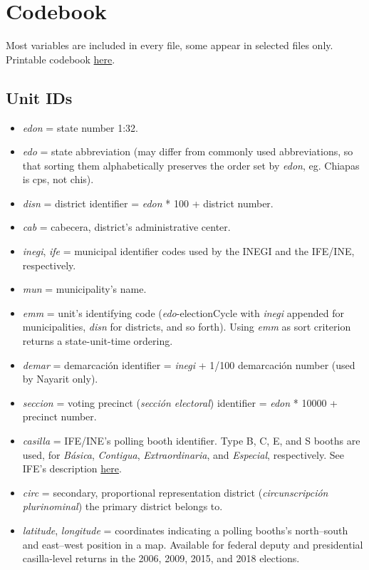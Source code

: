 \documentclass[11pt]{article}
\begin{document}
\section{Codebook}
\label{sec:orgffd06a6}
Most variables are included in every file, some appear in selected files only. Printable codebook \href{./codebook-flier.pdf}{here}. 
\subsection{Unit IDs}
\label{sec:org0b1b818}
\begin{itemize}
\item \emph{edon} = state number 1:32.
\item \emph{edo} = state abbreviation (may differ from commonly used abbreviations, so that sorting them alphabetically preserves the order set by \emph{edon}, eg. Chiapas is cps, not chis).
\item \emph{disn} = district identifier = \emph{edon} * 100 + district number.
\item \emph{cab} = cabecera, district's administrative center.
\item \emph{inegi}, \emph{ife} = municipal identifier codes used by the INEGI and the IFE/INE, respectively.
\item \emph{mun} = municipality's name.
\item \emph{emm} = unit's identifying code (\emph{edo}-electionCycle with \emph{inegi} appended for municipalities, \emph{disn} for districts, and so forth). Using \emph{emm} as sort criterion returns a state-unit-time ordering.
\item \emph{demar} = demarcación identifier = \emph{inegi} + 1/100 demarcación number (used by Nayarit only).
\item \emph{seccion} = voting precinct (\emph{sección electoral}) identifier = \emph{edon} * 10000 + precinct number.
\item \emph{casilla} = IFE/INE's polling booth identifier. Type B, C, E, and S booths are used, for \emph{Básica}, \emph{Contigua}, \emph{Extraordinaria}, and \emph{Especial}, respectively. See IFE's description \href{https://portalanterior.ine.mx/archivos2/Alterna/2016/PREP/CentroDeAyuda/Extraordinaria/rsc/pdf/tipos\_casillas.pdf}{here}.
\item \emph{circ} = secondary, proportional representation district (\emph{circunscripción plurinominal}) the primary district belongs to.
\item \emph{latitude}, \emph{longitude} = coordinates indicating a polling booths's north--south and east--west position in a map. Available for federal deputy and presidential casilla-level returns in the 2006, 2009, 2015, and 2018 elections.
\end{itemize}
\end{document}
